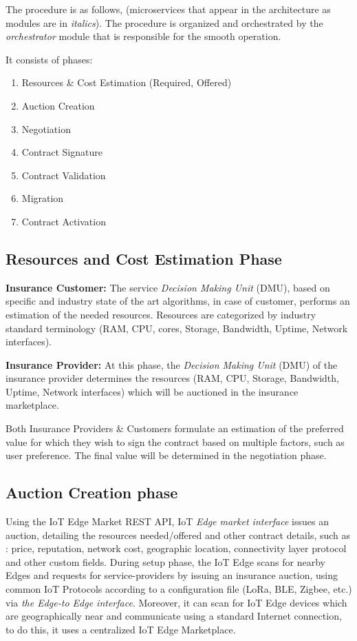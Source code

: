The procedure is as follows, (microservices that appear in the architecture as modules are in \textit{italics}). The procedure is organized and orchestrated by the \textit{orchestrator} module that is responsible for the smooth operation.

It consists of phases:
\begin{enumerate}
    \item Resources \& Cost Estimation (Required, Offered)
    \item Auction Creation
    \item Negotiation
    \item Contract Signature
    \item Contract Validation
    \item Migration
    \item Contract Activation
\end{enumerate}

\subsection{Resources and Cost Estimation Phase}

\noindent
\textbf{Insurance Customer:}
The service \textit{Decision Making Unit} (DMU), based on specific and industry state of the art algorithms, in case of customer, performs an estimation of the needed resources. Resources are categorized by industry standard terminology (RAM, CPU, cores, Storage, Bandwidth, Uptime, Network interfaces).

\noindent
\textbf{Insurance Provider:}
At this phase, the \textit{Decision Making Unit} (DMU) of the insurance provider determines the resources (RAM, CPU, Storage, Bandwidth, Uptime, Network interfaces) which will be auctioned in the insurance marketplace.
 
Both Insurance Providers \& Customers formulate an estimation of the preferred value for which they wish to sign the contract based on multiple factors, such as user preference. The final value will be determined in the negotiation phase.

\subsection{Auction Creation phase}
Using the IoT Edge Market REST API, IoT \textit{Edge market interface} issues an auction, detailing the resources needed/offered and other contract details, such as : price, reputation, network cost, geographic location, connectivity layer protocol and other custom fields. During setup phase, the IoT Edge scans for nearby Edges and requests for service-providers by issuing an insurance auction, using common IoT Protocols according to a configuration file (LoRa, BLE, Zigbee, etc.) via \textit{the Edge-to Edge interface}. Moreover, it can scan for IoT Edge devices which are geographically near and communicate using a standard Internet connection, to do this, it uses a centralized IoT Edge Marketplace.

